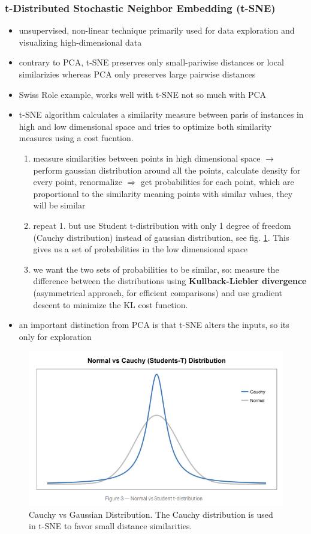 \documentclass[12pt,a4paper]{article}
\begin{document}
\subsubsection{t-Distributed Stochastic Neighbor Embedding (t-SNE)} %
\label{ssub:t_distributed_stochastic_neighbor_embedding_}
\begin{itemize}
  \item unsupervised, non-linear technique primarily used for data exploration and visualizing high-dimensional data
  \item contrary to PCA, t-SNE preserves only small-pariwise distances or local similarizies whereas PCA only preserves large pairwise distances
  \item Swiss Role example, works well with t-SNE not so much with PCA
  \item t-SNE algorithm calculates a similarity measure between paris of instances in high and low dimensional space and tries to optimize both similarity measures using a cost fucntion.
  \begin{enumerate}
    \item measure similarities between points in high dimensional space
    \newline \indent $\longrightarrow$ perform gaussian distribution around all the points, calculate density for every point, renormalize $\Longrightarrow$ get probabilities for each point, which are proportional to the similarity meaning points with similar values, they will be similar
    \item repeat 1. but use Student t-distribution with only 1 degree of freedom (Cauchy distribution) instead of gaussian distribution, see fig. \ref{fig:cauchyguas}. This gives us a set of probabilities in the low dimensional space
    \item we want the two sets of probabilities to be similar, so: measure the difference between the distributions using \textbf{Kullback-Liebler divergence} (asymmetrical approach, for efficient comparisons) and use gradient descent to minimize the KL cost function.
  \end{enumerate}
  \item an important distinction from PCA is that t-SNE alters the inputs, so its only for exploration
\end{itemize}
\begin{figure}
  \centering
  \includegraphics[width=.5\linewidth]{Images/Gaus_vs_Cauchy.png}
  \caption[Cauchy vs Gaussian Distribution]{Cauchy vs Gaussian Distribution. The Cauchy distribution is used in t-SNE to favor small distance similarities.}
  \label{fig:cauchyguas}
\end{figure}
\newpage
\end{document}
